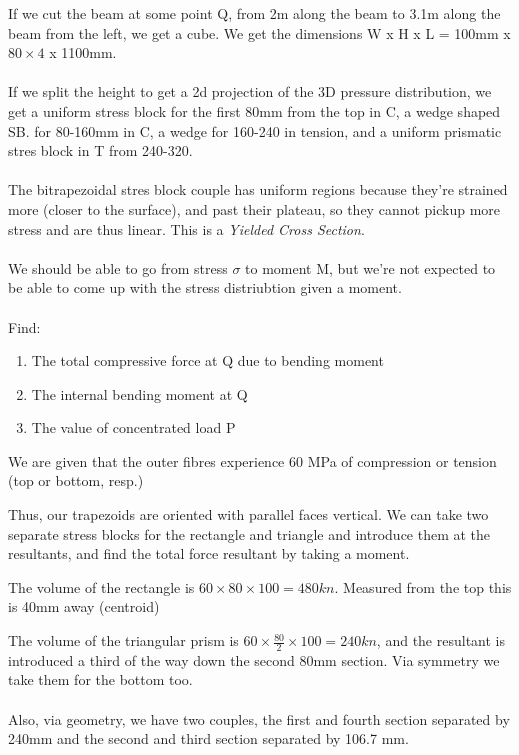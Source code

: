 \documentclass[10pt, twocolumn]{report}
\begin{document}
  If we cut the beam at some point Q, from 2m along the beam to 3.1m along the beam from the left, we get a cube. We get the dimensions W x H x L = 100mm x $80\times4$ x 1100mm.\\\\
  If we split the height to get a 2d projection of the 3D pressure distribution, we get a uniform stress block for the first 80mm from the top in C, a wedge shaped SB. for 80-160mm in C, a wedge for 160-240 in tension, and a uniform prismatic stres block in T from 240-320.\\\\The bitrapezoidal stres block couple has uniform regions because they're strained more (closer to the surface), and past their plateau, so they cannot pickup more stress and are thus linear. This is a \textit{Yielded Cross Section}.\\\\
  We should be able to go from stress $\sigma$ to moment M, but we're not expected to be able to come up with the stress distriubtion given a moment. \\\\
  Find:
  \begin{enumerate}
    \item The total compressive force at Q due to bending moment
    \item The internal bending moment at Q
    \item The value of concentrated load P
   \end{enumerate}
   We are given that the outer fibres experience 60 MPa of compression or tension (top or bottom, resp.)

   Thus, our trapezoids are oriented with parallel faces vertical. We can take two separate stress blocks for the rectangle and triangle and introduce them at the resultants, and find the total force resultant by taking a moment.

   The volume of the rectangle is $60 \times 80 \times 100 = 480kn$. Measured from the top this is 40mm away (centroid)

   The volume of the triangular prism is $60 \times \frac{80}{2} \times 100 = 240 kn$, and the resultant is introduced a third of the way down the second 80mm section. Via symmetry we take them for the bottom too. \\\\

   Also, via geometry, we have two couples, the first and fourth section separated by 240mm and the second and third section separated by 106.7 mm. \\\\
\end{document}
